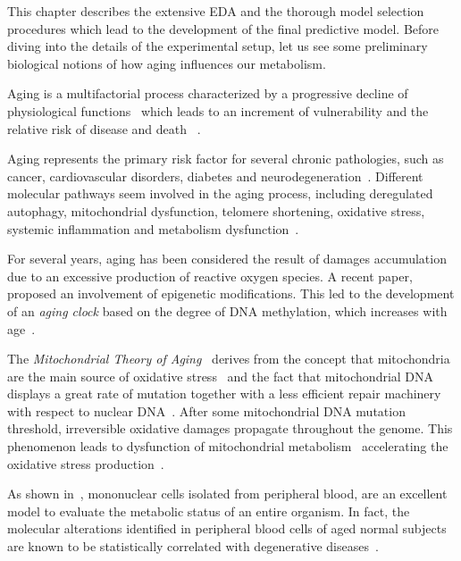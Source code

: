 This chapter describes the extensive EDA and the thorough model selection procedures which lead to the development of the final predictive model.
Before diving into the details of the experimental setup, let us see some preliminary biological notions of how aging influences our metabolism.

Aging is a multifactorial process characterized by a progressive decline of physiological functions~\cite{campisi2013aging} which leads to an increment of vulnerability and the relative risk of disease and death ~\cite{bratic2010mitochondrial}.

Aging represents the primary risk factor for several chronic pathologies, such as cancer, cardiovascular disorders, diabetes and neurodegeneration~\cite{lopez2013hallmarks}. Different molecular pathways seem involved in the aging process, including deregulated autophagy, mitochondrial dysfunction, telomere shortening, oxidative stress, systemic inflammation and metabolism dysfunction~\cite{lopez2013hallmarks, riera2016signaling}.

For several years, aging has been considered the result of damages accumulation due to an excessive production of reactive oxygen species.
A recent paper,  \cite{thompson2017epigenetic} proposed an involvement of epigenetic modifications. This led to the development of an \textit{aging clock} based on the degree of DNA methylation, which increases with age~\cite{horvath2013dna}. 

The \textit{Mitochondrial Theory of Aging}~\cite{harman1972biologic, sastre2000mitochondrial} derives from the  concept that mitochondria are the main source of oxidative stress~\cite{cadenas2000mitochondrial, turrens2003mitochondrial, dai2014mitochondrial} and the fact that mitochondrial DNA displays a
great rate of mutation together with a less efficient repair machinery with respect to nuclear DNA~\cite{short2005decline}. After some mitochondrial DNA mutation threshold, irreversible oxidative damages propagate throughout the genome. This phenomenon leads to dysfunction of mitochondrial metabolism~\cite{genova2004mitochondrial} accelerating the oxidative stress production~\cite{wallace2010mitochondrial}.

As shown in~\cite{mckerrell2015leukemia}, mononuclear cells isolated from peripheral blood, are an excellent model to evaluate the metabolic status of an entire organism. In fact, the molecular alterations identified in peripheral blood cells of aged normal subjects are known to be statistically correlated with degenerative diseases~\cite{jaiswal2014age}.



